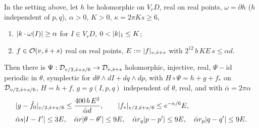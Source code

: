 \begin{proposition}\label{bpP:p2:osc-averaging}
In the setting above, let $h$ be holomorphic on $V_rD$, real on real points, $\omega=\partial h$ ($h$ independent of $p,q$), $\alpha>0$, $K>0$, $\kappa=2\pi Ks\ge6$,
\begin{enumerate}[label=(\textup{O}\arabic*)]
\item\label{bpP:p2:o1} $\lvert k\cdot\omega(I)\rvert\ge\alpha$ for $I\in V_rD$, $0<\lvert k\rvert_1\le K$;
\item\label{bpP:p2:o2} $f\in\mathcal O(v,\bar s+s)$ real on real points, $E:=\lvert f\rvert_{v,\bar s+s}$ with $2^{12}\,b\,KE\,s\le\alpha d$.
\end{enumerate}
Then there is $\Psi:\mathcal D_{v/2,\bar s+s/6}\to\mathcal D_{v,\bar s+s}$ holomorphic, injective, real, $\Psi-\mathrm{id}$ periodic in $\theta$, symplectic for $d\theta\wedge dI+dq\wedge dp$, with $H\circ\Psi=h+g+f_*$ on $\mathcal D_{v/2,\bar s+s/6}$, $H=h+f$, $g=g(I,p,q)$ independent of $\theta$, real, and with $\bar\alpha=2\pi\alpha$
\begin{align*}
&\lvert g-\hat f_0\rvert_{v/2,\bar s+s/6}\le\frac{400\,b\,E^2}{\bar\alpha d},\qquad\lvert f_*\rvert_{v/2,\bar s+s/6}\le e^{-\kappa/6}E,\\
&\bar\alpha s\lvert I-I'\rvert\le3E,\quad\bar\alpha r\lvert \theta-\theta'\rvert\le9E,\quad\bar\alpha r_q\lvert p-p'\rvert\le9E,\quad\bar\alpha r_p\lvert q-q'\rvert\le9E .
\end{align*}
\end{proposition}
